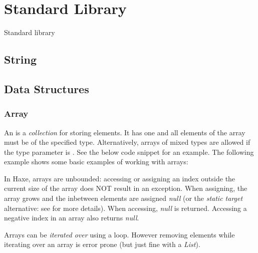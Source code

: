 \chapter{Standard Library}
\label{std}

Standard library

\section{String}
\label{std-String}



\section{Data Structures}
\label{std-ds}

\subsection{Array}
\label{std-Array}

An  is a \emph{collection} for storing elements.  It has one  and all elements of the array must be of the specified type.  Alternatively, arrays of mixed types are allowed if the type parameter is .  See the below code snippet for an example. 
The following example shows some basic examples of working with arrays:

In Haxe, arrays are unbounded:  accessing or assigning an index outside the current size of the array does NOT result in an exception.  When assigning, the array grows and the inbetween elements are assigned \emph{null} (or the \emph{static target} alternative: see  for more details).  When accessing, \emph{null} is returned.  Accessing a negative index in an array also returns \emph{null}.

Arrays can be \emph{iterated over} using a  loop.  However removing elements while iterating over an array is error prone (but just fine with a \emph{List}).

